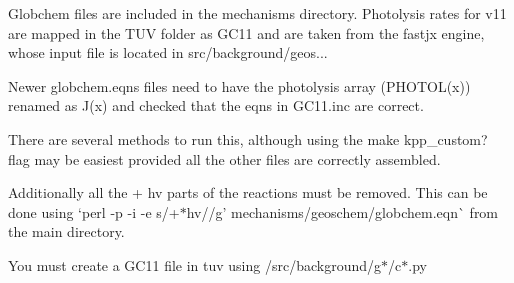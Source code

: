 Globchem files are included in the mechanisms directory. Photolysis rates for v11 are mapped in the T\+UV folder as G\+C11 and are taken from the fastjx engine, whose input file is located in src/background/geos...

Newer globchem.\+eqns files need to have the photolysis array (P\+H\+O\+T\+O\+L(x)) renamed as J(x) and checked that the eqns in G\+C11.\+inc are correct.

There are several methods to run this, although using the make kpp\+\_\+custom? flag may be easiest provided all the other files are correctly assembled.

Additionally all the \textquotesingle{}+ hv\textquotesingle{} parts of the reactions must be removed. This can be done using `perl -\/p -\/i -\/e \textquotesingle{}s/+$\ast$hv//g' mechanisms/geoschem/globchem.\+eqn\`{} from the main directory.

You must create a G\+C11 file in tuv using /src/background/g$\ast$/c$\ast$.py 